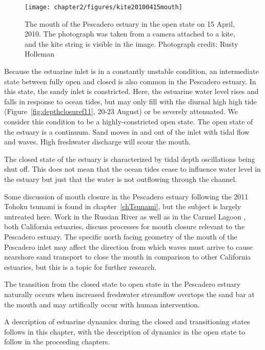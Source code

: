 \begin{figure}
	\begin{center}
		\texttt{[image: chapter2/figures/kite20100415mouth]} 
	\end{center}
\caption{The mouth of the Pescadero estuary in the open state on 15 April, 2010. The photograph was taken from a camera attached to a kite, and the kite string is visible in the image. Photograph credit: Rusty Holleman}\label{fig:kite_photos_open} \end{figure}

Because the estuarine inlet is in a constantly unstable condition, an intermediate state between fully open and closed is also common in the Pescadero estuary.  In this state, the sandy inlet is constricted. Here, the estuarine water level rises and falls in response to ocean tides, but may only fill with the diurnal high high tide (Figure~\ref{fig:depthclosuref11}, 20-23 August) or be severely attenuated. We consider this condition to be a highly-constricted open state. The open state of the estuary is a continuum. Sand moves in and out of the inlet with tidal flow and waves. High freshwater discharge will scour the mouth.

The closed state of the estuary is characterized by tidal depth oscillations being shut off. This does not mean that the ocean tides cease to influence water level in the estuary but just that the water is not outflowing through the channel.

Some discussion of mouth closure in the Pescadero estuary following the 2011 Tohoku tsunami is found in chapter~\ref{chTsunami}, but the subject is largely untreated here. Work in the Russian River \parencite{behrens_russian_2012, behrens_episodic_2013} as well as in the Carmel Lagoon \parencite{rich_hydrologic_2013}, both California estuaries, discuss processes for mouth closure relevant to the Pescadero estuary. The specific north facing geometry of the mouth of the Pescadero inlet may affect the direction from which waves must arrive to cause nearshore sand transport to close the mouth in comparison to other California estuaries, but this is a topic for further research.

The transition from the closed state to open state in the Pescadero estuary naturally occurs when increased freshwater streamflow overtops the sand bar at the mouth and may artifically occur with human intervention. 

A description of estuarine dynamics during the closed and transitioning states follows in this chapter, with the description of dynamics in the open state to follow in the proceeding chapters.


